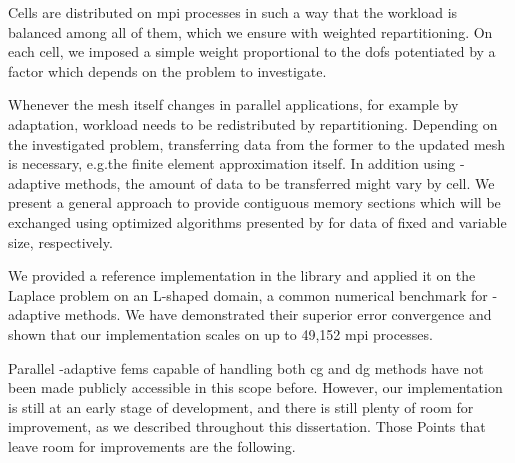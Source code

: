 Cells are distributed on \gls{mpi} processes in such a way that the workload is balanced among all of them, which we ensure with weighted repartitioning. On each cell, we imposed a simple weight proportional to the \glspl{dof} potentiated by a factor which depends on the problem to investigate.

Whenever the mesh itself changes in parallel applications, for example by adaptation, workload needs to be redistributed by repartitioning. Depending on the investigated problem, transferring data from the former to the updated mesh is necessary, e.g.\@ the finite element approximation itself. In addition using \hp-adaptive methods, the amount of data to be transferred might vary by cell. We present a general approach to provide contiguous memory sections which will be exchanged using optimized algorithms presented by \textcite{burstedde2018} for data of fixed and variable size, respectively.



We provided a reference implementation in the \dealii{} library and applied it on the Laplace problem on an L-shaped domain, a common numerical benchmark for \hp-adaptive methods. We have demonstrated their superior error convergence and shown that our implementation scales on up to 49,152 \gls{mpi} processes.




Parallel \hp-adaptive \glspl{fem} capable of handling both \gls{cg} and \gls{dg} methods have not been made publicly accessible in this scope before. However, our implementation is still at an early stage of development, and there is still plenty of room for improvement, as we described throughout this dissertation. Those Points that leave room for improvements are the following.

